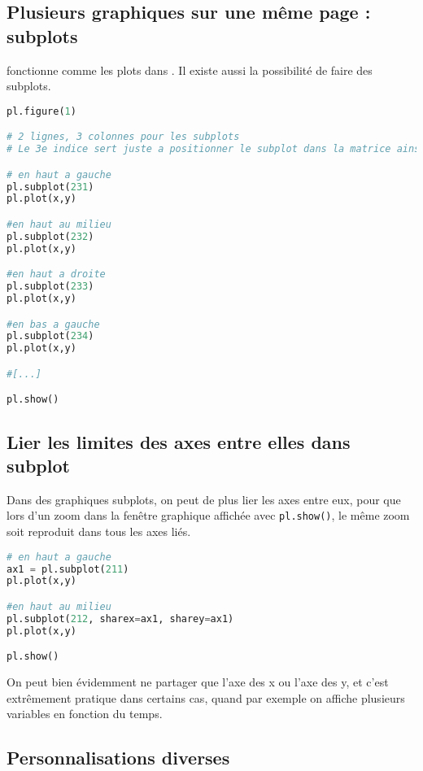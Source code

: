 \documentclass[a4paper,twoside]{article}
\begin{document}
\subsection{Plusieurs graphiques sur une même page : subplots}
 fonctionne comme les plots dans . Il existe aussi la possibilité de faire des subplots.

\begin{lstlisting}[language=python]
pl.figure(1)

# 2 lignes, 3 colonnes pour les subplots
# Le 3e indice sert juste a positionner le subplot dans la matrice ainsi creee

# en haut a gauche
pl.subplot(231)
pl.plot(x,y)

#en haut au milieu
pl.subplot(232)
pl.plot(x,y)

#en haut a droite
pl.subplot(233)
pl.plot(x,y)

#en bas a gauche
pl.subplot(234)
pl.plot(x,y)

#[...]

pl.show()
\end{lstlisting}

\subsection{Lier les limites des axes entre elles dans subplot}
Dans des graphiques subplots, on peut de plus lier les axes entre eux, pour que lors d'un zoom dans la fenêtre graphique affichée avec \texttt{pl.show()}, le même zoom soit reproduit dans tous les axes liés.

\begin{lstlisting}[language=python]
# en haut a gauche
ax1 = pl.subplot(211)
pl.plot(x,y)

#en haut au milieu
pl.subplot(212, sharex=ax1, sharey=ax1)
pl.plot(x,y)

pl.show()
\end{lstlisting}

\begin{remarque}
On peut bien évidemment ne partager que l'axe des x ou l'axe des y, et c'est extrêmement pratique dans certains cas, quand par exemple on affiche plusieurs variables en fonction du temps.
\end{remarque}

\subsection{Personnalisations diverses}
\end{document}

